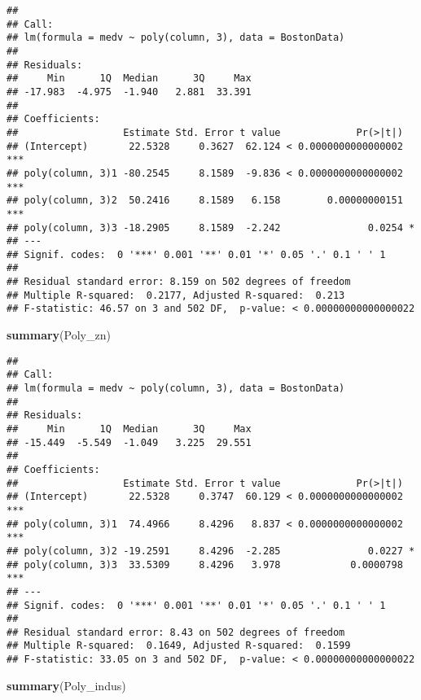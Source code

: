 \documentclass[]{article}
\newenvironment{Shaded}{\begin{snugshade}}{\end{snugshade}}
\newcommand{\KeywordTok}[1]{\textcolor[rgb]{0.13,0.29,0.53}{\textbf{#1}}}
\newcommand{\NormalTok}[1]{#1}
\begin{document}
\begin{verbatim}
## 
## Call:
## lm(formula = medv ~ poly(column, 3), data = BostonData)
## 
## Residuals:
##     Min      1Q  Median      3Q     Max 
## -17.983  -4.975  -1.940   2.881  33.391 
## 
## Coefficients:
##                  Estimate Std. Error t value             Pr(>|t|)    
## (Intercept)       22.5328     0.3627  62.124 < 0.0000000000000002 ***
## poly(column, 3)1 -80.2545     8.1589  -9.836 < 0.0000000000000002 ***
## poly(column, 3)2  50.2416     8.1589   6.158        0.00000000151 ***
## poly(column, 3)3 -18.2905     8.1589  -2.242               0.0254 *  
## ---
## Signif. codes:  0 '***' 0.001 '**' 0.01 '*' 0.05 '.' 0.1 ' ' 1
## 
## Residual standard error: 8.159 on 502 degrees of freedom
## Multiple R-squared:  0.2177, Adjusted R-squared:  0.213 
## F-statistic: 46.57 on 3 and 502 DF,  p-value: < 0.00000000000000022
\end{verbatim}

\begin{Shaded}
\begin{Highlighting}[]
\KeywordTok{summary}\NormalTok{(Poly_zn)}
\end{Highlighting}
\end{Shaded}

\begin{verbatim}
## 
## Call:
## lm(formula = medv ~ poly(column, 3), data = BostonData)
## 
## Residuals:
##     Min      1Q  Median      3Q     Max 
## -15.449  -5.549  -1.049   3.225  29.551 
## 
## Coefficients:
##                  Estimate Std. Error t value             Pr(>|t|)    
## (Intercept)       22.5328     0.3747  60.129 < 0.0000000000000002 ***
## poly(column, 3)1  74.4966     8.4296   8.837 < 0.0000000000000002 ***
## poly(column, 3)2 -19.2591     8.4296  -2.285               0.0227 *  
## poly(column, 3)3  33.5309     8.4296   3.978            0.0000798 ***
## ---
## Signif. codes:  0 '***' 0.001 '**' 0.01 '*' 0.05 '.' 0.1 ' ' 1
## 
## Residual standard error: 8.43 on 502 degrees of freedom
## Multiple R-squared:  0.1649, Adjusted R-squared:  0.1599 
## F-statistic: 33.05 on 3 and 502 DF,  p-value: < 0.00000000000000022
\end{verbatim}

\begin{Shaded}
\begin{Highlighting}[]
\KeywordTok{summary}\NormalTok{(Poly_indus)}
\end{Highlighting}
\end{Shaded}
\end{document}
